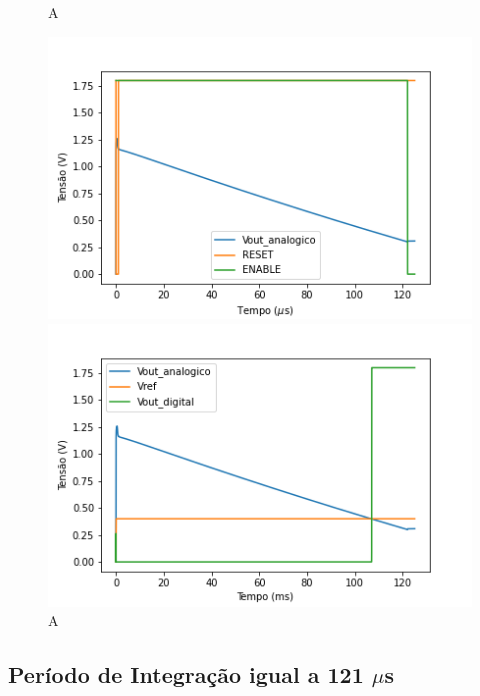 \begin{figure}[htb]
 \centering
  \begin{minipage}{0.4\textwidth}
    \centering
    \caption{   A}
    \includegraphics[scale=0.8]{Resultados/Graficos/reseteenable-tb_pixel125.png}
  \end{minipage}
  \hfill
  \begin{minipage}{0.4\textwidth}
    \centering
    \caption{A} 
    \includegraphics[scale=0.8]{Resultados/Graficos/analogicoedigital-tb_pixel125.png}
  \end{minipage}
\end{figure}

\subsection{Período de Integração igual a 121 $\mu$s}
